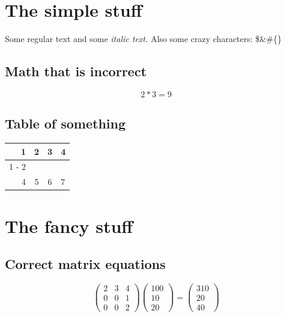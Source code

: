 \documentclass{article}%
\begin{document}
%
\normalsize%
\section{The simple stuff}%
\label{sec:Thesimplestuff}%
Some regular text and some%
\textit{ italic text. }%
\newline%
Also some crazy characters: \$\&\#\{\}%
\subsection{Math that is incorrect}%
\label{subsec:Maththatisincorrect}%
\[%
2*3 = 9%
\]

%
\subsection{Table of something}%
\label{subsec:Tableofsomething}%
\begin{tabular}{rc|cl}%
\hline%
1&2&3&4\\%
\cline{1%
-%
2}%
&&&\\%
4&5&6&7\\%
\end{tabular}

%
\section{The fancy stuff}%
\label{sec:Thefancystuff}%
\subsection{Correct matrix equations}%
\label{subsec:Correctmatrixequations}%
\[%
\begin{pmatrix}%
2&3&4\\%
0&0&1\\%
0&0&2%
\end{pmatrix} \begin{pmatrix}%
100\\%
10\\%
20%
\end{pmatrix} = \begin{pmatrix}%
310\\%
20\\%
40%
\end{pmatrix}%
\]

%
\end{document}

